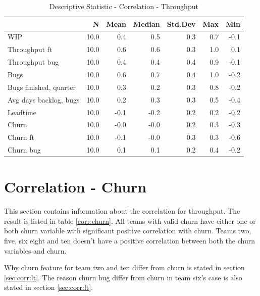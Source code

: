\documentclass[UKenglish]{ifimaster}  %
\begin{document}
\begin{table}[!htbp]
 \centering
 \begin{tabular}{ | l | r | r | r | r | r | r | }
 \hline
& N & Mean & Median & Std.Dev & Max & Min \\ \hline
WIP  & 10.0 & 0.4 & 0.5 & 0.3 & 0.7 & -0.1\\ \hline
Throughput ft  & 10.0 & 0.6 & 0.6 & 0.3 & 1.0 & 0.1\\ \hline
Throughput bug  & 10.0 & 0.4 & 0.4 & 0.4 & 0.9 & -0.1\\ \hline
Bugs  & 10.0 & 0.6 & 0.7 & 0.4 & 1.0 & -0.2\\ \hline
Bugs finished, quarter  & 10.0 & 0.3 & 0.2 & 0.3 & 0.8 & -0.2\\ \hline
Avg days backlog, bugs  & 10.0 & 0.2 & 0.3 & 0.3 & 0.5 & -0.4\\ \hline
Leadtime  & 10.0 & -0.1 & -0.2 & 0.2 & 0.2 & -0.2\\ \hline
Churn  & 10.0 & -0.0 & -0.0 & 0.2 & 0.3 & -0.3\\ \hline
Churn ft  & 10.0 & -0.1 & -0.0 & 0.3 & 0.3 & -0.6\\ \hline
Churn bug  & 10.0 & 0.1 & 0.1 & 0.2 & 0.4 & -0.2\\ \hline
\end{tabular}
 \caption{Descriptive Statistic - Correlation - Throughput}
 \label{DS:corr:TP}
 \end{table}

\section{Correlation - Churn}
\label{sec:corr:churn}
This section contains information about the correlation for throughput. The result is listed in table \ref{corr:churn}.  All teams with valid churn have either one or both churn variable with significant positive correlation with churn. Teams two, five, six eight and ten doesn't have a positive correlation between both the churn variables and churn.  

Why churn feature for team two and ten differ from churn is stated in section \ref{sec:corr:lt}. The reason churn bug differ from churn in team six's case is also stated in section \ref{sec:corr:lt}. 
 
\end{document}
